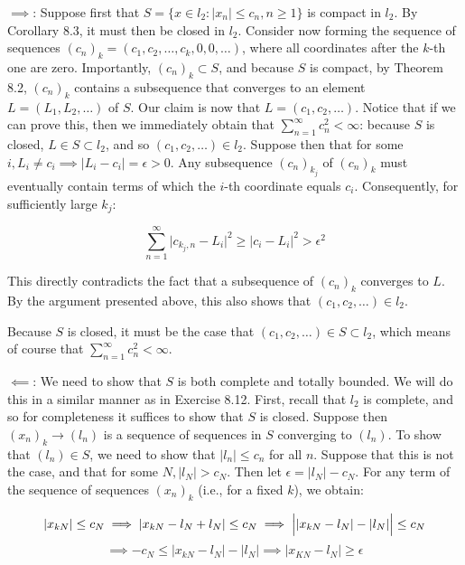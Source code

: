 \begin{solution}
    
    $\implies$: Suppose first that $S = \{x \in l_2 : \lvert x_n \rvert \leq c_n, n \geq 1\}$ is compact in $l_2$.
    By Corollary 8.3, it must then be closed in $l_2$.
    Consider now forming the sequence of sequences $(c_n)_k = (c_1, c_2, \ldots, c_k, 0 ,0, \ldots)$, where all coordinates after the $k$-th one are zero.
    Importantly, $(c_n)_k \subset S$, and because $S$ is compact, by Theorem 8.2, $(c_n)_k$ contains a subsequence that converges to an element $L = (L_1, L_2, \ldots)$ of $S$.
    Our claim is now that $L = (c_1, c_2, \ldots)$.
    Notice that if we can prove this, then we immediately obtain that $\sum_{n=1}^{\infty} c_n^2 < \infty$: because $S$ is closed, $L \in S \subset l_2$, and so  $(c_1, c_2, \ldots) \in l_2$.
    Suppose then that for some $i, L_i \neq c_i \implies \lvert L_i - c_i \rvert = \epsilon > 0$.
    Any subsequence $(c_n)_{k_j}$ of $(c_n)_k$ must eventually contain terms of which the $i$-th coordinate equals $c_i$.
    Consequently, for sufficiently large $k_j$:

    \[\sum_{n=1}^{\infty} \lvert c_{k_j, n} - L_i \rvert^2 \geq \lvert c_{i} - L_i \rvert^2 > \epsilon^2\]

    This directly contradicts the fact that a subsequence of $(c_n)_k$ converges to $L$.
    By the argument presented above, this also shows that $(c_1, c_2, \ldots) \in l_2$.

    Because $S$ is closed, it must be the case that $(c_1, c_2, \ldots) \in S \subset l_2$, which means of course that $\sum_{n=1}^{\infty} c_n^2 < \infty$.

    $\impliedby$: We need to show that $S$ is both complete and totally bounded.
    We will do this in a similar manner as in Exercise 8.12.
    First, recall that $l_2$ is complete, and so for completeness it suffices to show that $S$ is closed.
    Suppose then $(x_n)_k \rightarrow (l_n)$ is a sequence of sequences in $S$ converging to $(l_n)$.
    To show that $(l_n) \in S$, we need to show that $\lvert l_n \rvert \leq c_n$ for all $n$.
    Suppose that this is not the case, and that for some $N, \lvert l_N \rvert > c_N$.
    Then let $\epsilon = \lvert l_N \rvert - c_N$.
    For any term of the sequence of sequences $(x_n)_k$ (i.e., for a fixed $k$), we obtain:

    \[\lvert x_{kN} \rvert \leq c_N \implies \lvert x_{kN} - l_N + l_N \rvert \leq c_N \implies \Bigl \lvert \lvert x_{kN} - l_N \rvert - \lvert l_N \rvert \Bigr \rvert \leq c_N\]
    \[\implies - c_N \leq \lvert x_{kN} - l_N \rvert - \lvert l_N \rvert \implies \lvert x_{KN} - l_N \rvert \geq \epsilon\]


\end{solution}
